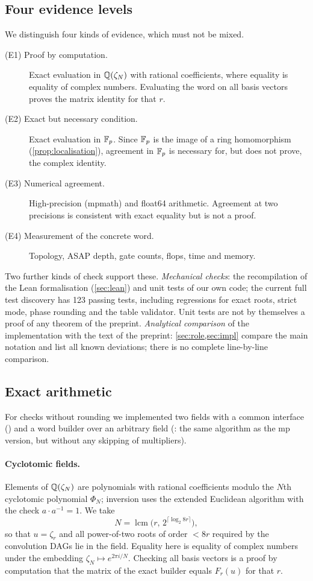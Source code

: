 \documentclass[11pt]{article}
\theoremstyle{plain}
\DeclareMathOperator{\lcm}{lcm}
\begin{document}
\subsection{Four evidence levels}\label{sec:evidence}
We distinguish four kinds of evidence, which must not be mixed.
\begin{description}
\item[(E1) Proof by computation.] Exact evaluation in $\mathbb{Q}(\zeta_N)$ with rational coefficients, where equality is equality of complex numbers. Evaluating the word on all basis vectors proves the matrix identity for that $r$.
\item[(E2) Exact but necessary condition.] Exact evaluation in $\mathbb{F}_p$. Since $\mathbb{F}_p$ is the image of a ring homomorphism (\cref{prop:localisation}), agreement in $\mathbb{F}_p$ is necessary for, but does not prove, the complex identity.
\item[(E3) Numerical agreement.] High-precision (mpmath) and float64 arithmetic. Agreement at two precisions is consistent with exact equality but is not a proof.
\item[(E4) Measurement of the concrete word.] Topology, ASAP depth, gate counts, flops, time and memory.
\end{description}
Two further kinds of check support these. \emph{Mechanical checks}: the recompilation of the Lean formalisation (\cref{sec:lean}) and unit tests of our own code; the current full test discovery has 123 passing tests, including regressions for exact roots, strict mode, phase rounding and the table validator. Unit tests are not by themselves a proof of any theorem of the preprint. \emph{Analytical comparison} of the implementation with the text of the preprint: \cref{sec:role,sec:impl} compare the main notation and list all known deviations; there is no complete line-by-line comparison.

\subsection{Exact arithmetic}\label{sec:exact}
For checks without rounding we implemented two fields with a common interface () and a word builder over an arbitrary field (: the same algorithm as the mp version, but without any skipping of multipliers).

\paragraph{Cyclotomic fields.}
Elements of $\mathbb{Q}(\zeta_N)$ are polynomials with rational coefficients modulo the $N$th cyclotomic polynomial $\Phi_N$; inversion uses the extended Euclidean algorithm with the check $a\cdot a^{-1}=1$. We take
\begin{equation}\label{eq:N}
N=\lcm\bigl(r,\,2^{\lceil\log_2 8r\rceil}\bigr),
\end{equation}
so that $u=\zeta_r$ and all power-of-two roots of order $<8r$ required by the convolution DAGs lie in the field. Equality here is equality of complex numbers under the embedding $\zeta_N\mapsto e^{2\pi i/N}$. Checking all basis vectors is a proof by computation that the matrix of the exact builder  equals $F_r(u)$ for that $r$.
\end{document}
